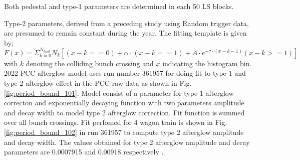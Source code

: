 Both pedestal and type-1 parameters are determined in each 50 LS blocks.

Type-2 parameters, derived from a preceding study using Random trigger data, are presumed to remain constant during the year. The fitting template is given by:
\begin{equation}
F(x) = \Sigma_{k=0}^{N_{bcid}} N_k \left[(x-k==0)+\alpha\cdot(x-k==1)+A \cdot e^{-\tau\cdot(x-k-1)}(x-k>=1) \right]
\end{equation}
with $k$ denoting the colliding bunch crossing and $x$ indicating the histogram bin. 2022 PCC afterglow model uses run number 361957 for doing fit to type 1 and type 2 afterglow effect in the PCC raw data as shown in Fig. \ref{fig:period_bound_101}. Model consist of a parameter for type 1 afterglow correcton and exponentially decaying function with two parameters amplitude and decay width to model type 2 afterglow correction. Fit function is summed over all bunch crossings. Fit perfomed for 4 wagon train is shown in Fig.  \ref{fig:period_bound_102} in run 361957 to compute type 2 afterglow amplitude and decay width. The values obtained for type 2 afterglow amplitude and decay parameters are 0.0007915 and 0.00918 respectively \cite{bril2023afterglow}.

